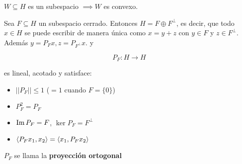 \begin{fexample}
    $W\subseteq H$ es un subespacio $\implies W$ es convexo.
\end{fexample}

\begin{ftheorem}
    Sea $F\subseteq H$ un subespacio cerrado. Entonces $H=F\oplus F^\perp$, es decir, que todo $x\in H$ se puede escribir de manera única como $x=y+z$ con $y\in F$ y $z\in F^\perp$. Además $y=P_Fx, z=P_{F^\perp} x$. y 

    \[P_F:H\to H\]

    es lineal, acotado y satisface:

    \begin{itemize}
        \item $||P_F||\leq 1$ ($=1$ cuando $F=\{0\}$)
        \item $P_F^2=P_F$
        \item $\operatorname{Im} P_F=F$, $\ker P_F=F^\perp$
        \item $\left\langle P_Fx_1,x_2\right\rangle=\left\langle x_1,P_Fx_2\right\rangle$
    \end{itemize}
\end{ftheorem}

\begin{fdefinition}
    $P_F$ se llama la \textbf{proyección ortogonal}
\end{fdefinition}

